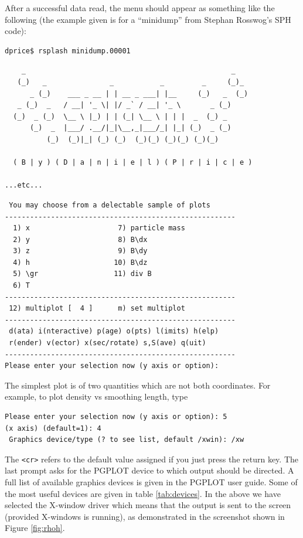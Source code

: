 \documentclass[a4paper,11pt]{article}
\begin{document}
After a successful data read, the menu should appear as something like the
following (the example given is for a ``minidump'' from Stephan Rosswog's SPH code):
\begin{verbatim}
dprice$ rsplash minidump.00001 
\end{verbatim}
\begin{verbatim}
    _                                                 _  
   (_)   _               _           _         _     (_)_
      _ (_)    ___ _ __ | | __ _ ___| |__     (_)   _  (_)
   _ (_)  _   / __| '_ \| |/ _` / __| '_ \       _ (_)    
  (_)  _ (_)  \__ \ |_) | | (_| \__ \ | | |  _  (_) _    
      (_)  _  |___/ .__/|_|\__,_|___/_| |_| (_)  _ (_)   
          (_)  (_)|_| (_) (_)  (_)(_) (_)(_) (_)(_)     

  ( B | y ) ( D | a | n | i | e | l ) ( P | r | i | c | e )

...etc...
\end{verbatim}
\begin{verbatim}
 You may choose from a delectable sample of plots 
-------------------------------------------------------
  1) x                     7) particle mass       
  2) y                     8) B\dx                
  3) z                     9) B\dy                
  4) h                    10) B\dz                
  5) \gr                  11) div B               
  6) T                   
-------------------------------------------------------
 12) multiplot [  4 ]      m) set multiplot 
-------------------------------------------------------
 d(ata) i(nteractive) p(age) o(pts) l(imits) h(elp)
 r(ender) v(ector) x(sec/rotate) s,S(ave) q(uit)
-------------------------------------------------------
Please enter your selection now (y axis or option):
\end{verbatim}
The simplest plot is of two quantities which are not both coordinates. For
example, to plot density vs smoothing length, type
\begin{verbatim}
Please enter your selection now (y axis or option): 5
(x axis) (default=1): 4
 Graphics device/type (? to see list, default /xwin): /xw
\end{verbatim}
 The \verb+<cr>+ refers to the default value assigned if you just press the return key. The last prompt asks for the PGPLOT device to which output should be directed. A full list of available graphics devices is given in the PGPLOT user guide. Some of the most useful devices are given in table \ref{tab:devices}. In the
above we have selected the X-window driver which means that the output is sent to the
screen (provided X-windows is running), as demonstrated in the screenshot shown in Figure \ref{fig:rhoh}. 
\end{document}
